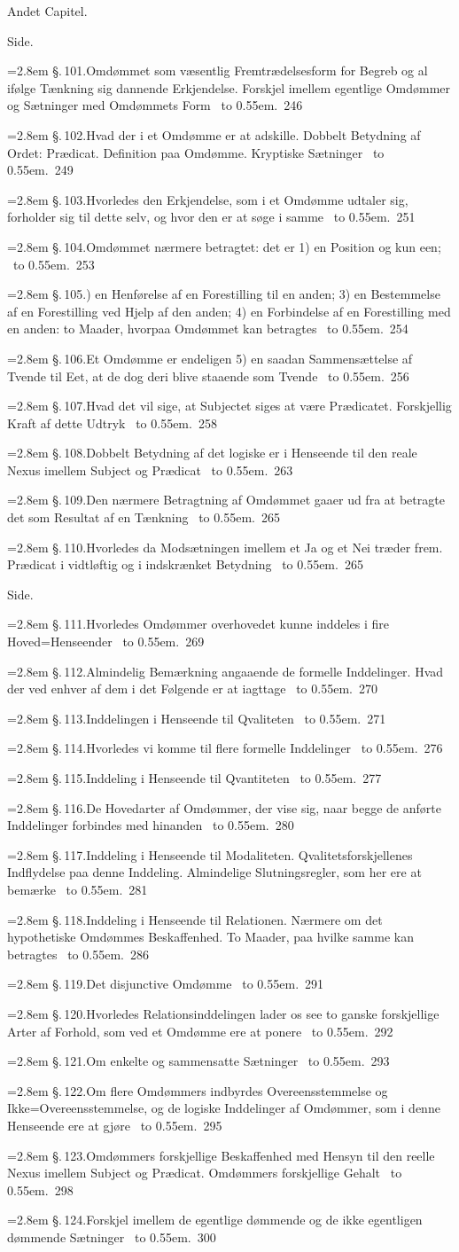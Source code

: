 \documentclass[12pt]{book}
\def\sperr#1{#1}%
\def\textit#1{#1}%
\newcommand{\sperr}[1]{\textls[180]{#1}}
\newcommand{\ovside}{\par\nopagebreak\hfill{\footnotesize Side.}\par\nobreak\vspace{0.2\baselineskip}}
\newcommand{\ovcap}[2]{%
  \par\vspace{1.0\baselineskip}%
  \begin{center}{\sperr{#1}\par}\vspace{0.3\baselineskip}{#2\par}\end{center}
  \vspace{0.4\baselineskip}}
\newcommand{\ovline}[3]{%
  \par\vspace{0.25\baselineskip}%
  \noindent\hangindent=2.8em\hangafter=1
  \textit{\S.\,#1.}\quad #2%
  \nobreak\ \leaders\hbox to 0.55em{\hss.\hss}\hfill\ \textit{#3}\par}
\begin{document}
\ovcap{Andet Capitel.}{Om Begrebers og overhovedet Erkjendelsers Fremstilling
  ved Hjelp af \sperr{Omdømmer} og disses Natur og Beskaffenhed i
  Almindelighed.}
\ovside
\ovline{101}{Omdømmet som væsentlig Fremtrædelsesform for Begreb og al ifølge
  Tænkning sig dannende Erkjendelse. Forskjel imellem egentlige Omdømmer og
  Sætninger med Omdømmets Form}{246}
\ovline{102}{Hvad der i et Omdømme er at adskille. Dobbelt Betydning af
  Ordet: Prædicat. Definition paa Omdømme. Kryptiske Sætninger}{249}
\ovline{103}{Hvorledes den Erkjendelse, som i et Omdømme udtaler sig,
  forholder sig til dette selv, og hvor den er at søge i samme}{251}
\ovline{104}{Omdømmet nærmere betragtet: det er 1) en Position og kun
  een;}{253}
\ovline{105}{2) en Henførelse af en Forestilling til en anden; 3) en
  Bestemmelse af en Forestilling ved Hjelp af den anden; 4) en Forbindelse af
  en Forestilling med en anden: to Maader, hvorpaa Omdømmet kan
  betragtes}{254}
\ovline{106}{Et Omdømme er endeligen 5) en saadan Sammensættelse af Tvende til
  Eet, at de dog deri blive staaende som Tvende}{256}
\ovline{107}{Hvad det vil sige, at Subjectet siges at være Prædicatet.
  Forskjellig Kraft af dette Udtryk}{258}
\ovline{108}{Dobbelt Betydning af det logiske \sperr{er} i Henseende til den
  reale Nexus imellem Subject og Prædicat}{263}
\ovline{109}{Den nærmere Betragtning af Omdømmet gaaer ud fra at betragte det
  som Resultat af en Tænkning}{265}
\ovline{110}{Hvorledes da Modsætningen imellem et Ja og et Nei træder frem.
  Prædicat i vidtløftig og i indskrænket Betydning}{265}

\ovside
\ovline{111}{Hvorledes Omdømmer overhovedet kunne inddeles i fire
  Hoved=Henseender}{269}
\ovline{112}{Almindelig Bemærkning angaaende de formelle Inddelinger. Hvad der
  ved enhver af dem i det Følgende er at iagttage}{270}
\ovline{113}{Inddelingen i Henseende til Qvaliteten}{271}
\ovline{114}{Hvorledes vi komme til flere formelle Inddelinger}{276}
\ovline{115}{Inddeling i Henseende til Qvantiteten}{277}
\ovline{116}{De Hovedarter af Omdømmer, der vise sig, naar begge de anførte
  Inddelinger forbindes med hinanden}{280}
\ovline{117}{Inddeling i Henseende til Modaliteten. Qvalitetsforskjellenes
  Indflydelse paa denne Inddeling. Almindelige Slutningsregler, som her ere at
  bemærke}{281}
\ovline{118}{Inddeling i Henseende til Relationen. Nærmere om det hypothetiske
  Omdømmes Beskaffenhed. To Maader, paa hvilke samme kan betragtes}{286}
\ovline{119}{Det disjunctive Omdømme}{291}
\ovline{120}{Hvorledes Relationsinddelingen lader os see to ganske
  forskjellige Arter af Forhold, som ved et Omdømme ere at ponere}{292}
\ovline{121}{Om enkelte og sammensatte Sætninger}{293}
\ovline{122}{Om flere Omdømmers indbyrdes Overeensstemmelse og
  Ikke=Overeensstemmelse, og de logiske Inddelinger af Omdømmer, som i denne
  Henseende ere at gjøre}{295}
\ovline{123}{Omdømmers forskjellige Beskaffenhed med Hensyn til den reelle
  Nexus imellem Subject og Prædicat. Omdømmers forskjellige Gehalt}{298}
\ovline{124}{Forskjel imellem de egentlige dømmende og de ikke egentligen
  dømmende Sætninger}{300}
\end{document}
